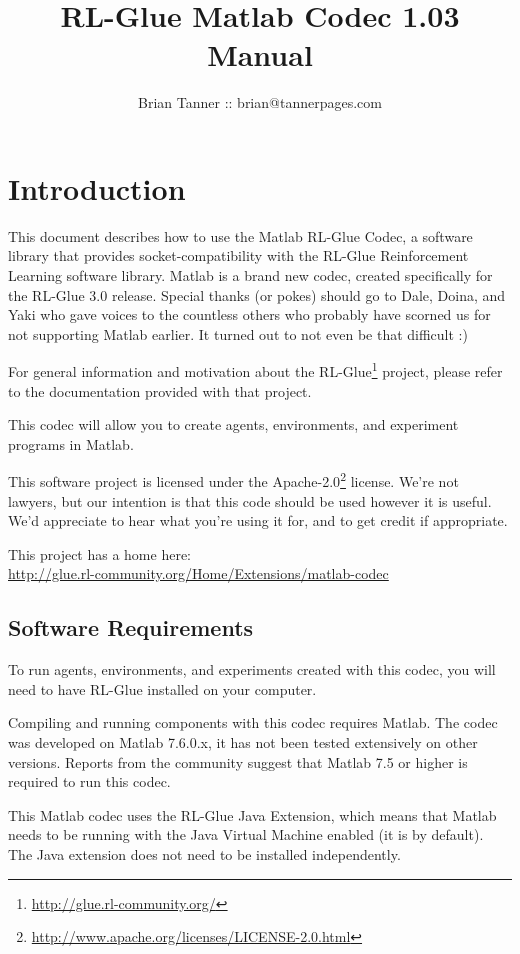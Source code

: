 \documentclass[11pt]{article}
\title{RL-Glue Matlab Codec 1.03 Manual }
\author{Brian Tanner :: brian@tannerpages.com}
\date{}
\begin{document}
\maketitle
\tableofcontents

\section{Introduction}

This document describes how to use the Matlab RL-Glue Codec, a software library that provides socket-compatibility with the RL-Glue Reinforcement Learning software library.  Matlab is a brand new codec, created specifically for the RL-Glue 3.0 release.  Special thanks (or pokes) should go to Dale, Doina, and Yaki who gave voices to the countless others who probably
have scorned us for not supporting Matlab earlier.  It turned out to not even be that difficult :)

For general information and motivation about the RL-Glue\footnote{\url{http://glue.rl-community.org/}} project, please refer to the documentation provided with that project.

This codec will allow you to create agents, environments, and experiment programs in Matlab.

This software project is licensed under the Apache-2.0\footnote{\url{http://www.apache.org/licenses/LICENSE-2.0.html}} license. We're not lawyers, but our intention is that this code 
should be used however it is useful.  We'd appreciate to hear what you're using it for, and to get credit if appropriate.

This project has a home here:\\
\url{http://glue.rl-community.org/Home/Extensions/matlab-codec}


\subsection{Software Requirements}
To run agents, environments, and experiments created with this codec, you will need to have RL-Glue installed on your computer.

Compiling and running components with this codec requires Matlab.  The codec was developed on Matlab 7.6.0.x, it has not been tested extensively on other versions.  Reports from the community suggest that Matlab 7.5 or higher is required to run this codec.

This Matlab codec uses the RL-Glue Java Extension, which means that Matlab needs to be running with the Java Virtual Machine enabled (it is by default).  The Java extension does not need to be installed independently.
\end{document}
